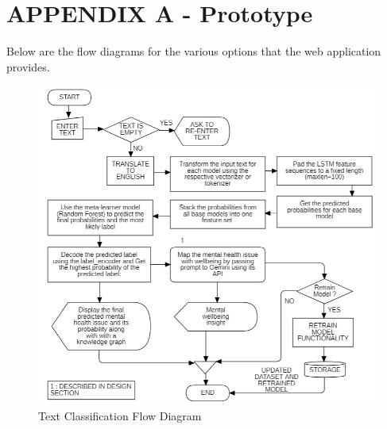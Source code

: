 

\section*{APPENDIX A - Prototype \label{sec:proto}}

\noindent
Below are the flow diagrams for the various options that the web application provides.

\begin{figure}[h!]  
    \centering
    \includegraphics[width=1.0\textwidth]{Images/APP TEXT OPTION.png}  
    \caption{Text Classification Flow Diagram}
    \label{012i}  %
\end{figure}

